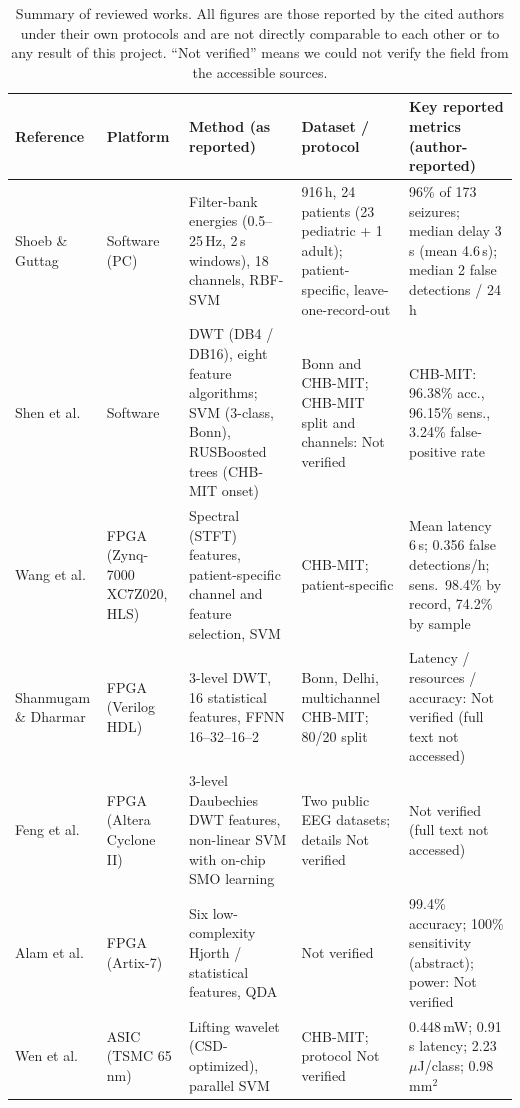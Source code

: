 \documentclass[10pt,twocolumn,letterpaper]{article}
\begin{document}
\begin{table}[t]
\centering
\caption{Summary of reviewed works. All figures are those reported by
the cited authors under their own protocols and are not directly
comparable to each other or to any result of this project. ``Not
verified'' means we could not verify the field from the accessible
sources.}
\label{tab:lit}
\footnotesize
\begin{tabularx}{\textwidth}{@{}p{1.9cm}p{2.3cm}XXX@{}}
\toprule
Reference & Platform & Method (as reported) & Dataset / protocol & Key reported metrics (author-reported) \\
\midrule
Shoeb \& Guttag \cite{shoeb2010icml} & Software (PC)
  & Filter-bank energies (0.5--25\,Hz, 2\,s windows), 18 channels, RBF-SVM
  & 916\,h, 24 patients (23 pediatric + 1 adult); patient-specific, leave-one-record-out
  & 96\% of 173 seizures; median delay 3\,s (mean 4.6\,s); median 2 false detections / 24\,h \\
Shen et al. \cite{shen2022dwt} & Software
  & DWT (DB4 / DB16), eight feature algorithms; SVM (3-class, Bonn), RUSBoosted trees (CHB-MIT onset)
  & Bonn and CHB-MIT; CHB-MIT split and channels: Not verified
  & CHB-MIT: 96.38\% acc., 96.15\% sens., 3.24\% false-positive rate \\
Wang et al. \cite{wang2017integrating} & FPGA (Zynq-7000 XC7Z020, HLS)
  & Spectral (STFT) features, patient-specific channel and feature selection, SVM
  & CHB-MIT; patient-specific
  & Mean latency 6\,s; 0.356 false detections/h; sens.\ 98.4\% by record, 74.2\% by sample \\
Shanmugam \& Dharmar \cite{shanmugam2025ffnn} & FPGA (Verilog HDL)
  & 3-level DWT, 16 statistical features, FFNN 16--32--16--2
  & Bonn, Delhi, multichannel CHB-MIT; 80/20 split
  & Latency / resources / accuracy: Not verified (full text not accessed) \\
Feng et al. \cite{feng2018vlsi} & FPGA (Altera Cyclone II)
  & 3-level Daubechies DWT features, non-linear SVM with on-chip SMO learning
  & Two public EEG datasets; details Not verified
  & Not verified (full text not accessed) \\
Alam et al. \cite{alam2024qda} & FPGA (Artix-7)
  & Six low-complexity Hjorth / statistical features, QDA
  & Not verified
  & 99.4\% accuracy; 100\% sensitivity (abstract); power: Not verified \\
Wen et al. \cite{wen2022asic} & ASIC (TSMC 65\,nm)
  & Lifting wavelet (CSD-optimized), parallel SVM
  & CHB-MIT; protocol Not verified
  & 0.448\,mW; 0.91\,s latency; 2.23\,$\mu$J/class; 0.98\,mm$^2$ \\
\bottomrule
\end{tabularx}
\end{table}
\end{document}
